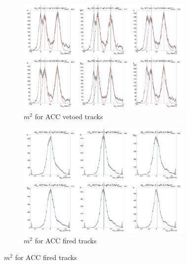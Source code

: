 \begin{figure}[H]
  \ContinuedFloat
    \begin{subfigure}{1\textwidth}
   \centering
   \includegraphics[width=0.94\textwidth]{hiptfits/pos/PSm2_cent0_ich1_accfire0_ptbin8.jpg}
    \caption{$m^2$ for ACC vetoed tracks}
    \end{subfigure}
    \begin{subfigure}{1\textwidth}
   \centering
   \includegraphics[width=0.94\textwidth]{hiptfits/pos/PSm2_cent0_ich1_accfire1_ptbin8.jpg}
    \caption{$m^2$ for ACC fired tracks}
    \end{subfigure}  
\end{figure}
